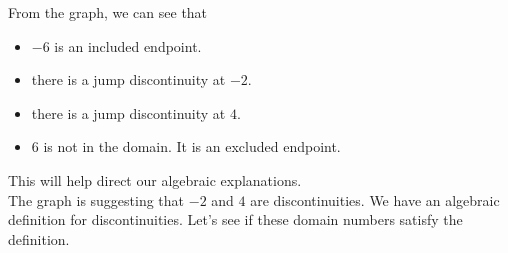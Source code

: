 \documentclass{ximera}
\begin{document}
\begin{observation} 
From the graph, we can see that 

\begin{itemize}
\item $-6$ is an included endpoint.  
\item there is a jump discontinuity at $-2$.
\item there is a jump discontinuity at $4$.
\item $6$ is not in the domain. It is an excluded endpoint.
\end{itemize}



\end{observation}


This will help direct our algebraic explanations. \\


The graph is suggesting that $-2$ and $4$ are discontinuities.  We have an algebraic definition for discontinuities.  Let's see if these domain numbers satisfy the definition. \\
\end{document}
